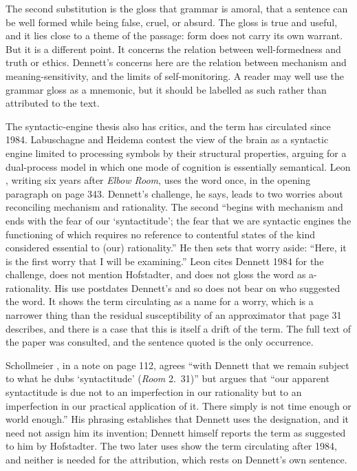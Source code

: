 \documentclass[11pt]{article}
\begin{document}
The second substitution is the gloss that grammar is amoral, that a sentence can be well formed while being false, cruel, or absurd. The gloss is true and useful, and it lies close to a theme of the passage: form does not carry its own warrant. But it is a different point. It concerns the relation between well-formedness and truth or ethics. Dennett's concerns here are the relation between mechanism and meaning-sensitivity, and the limits of self-monitoring. A reader may well use the grammar gloss as a mnemonic, but it should be labelled as such rather than attributed to the text.

The syntactic-engine thesis also has critics, and the term has circulated since 1984. Labuschagne and Heidema \cite{labuschagne2005} contest the view of the brain as a syntactic engine limited to processing symbols by their structural properties, arguing for a dual-process model in which one mode of cognition is essentially semantical. Leon \cite{leon1990}, writing six years after \emph{Elbow Room}, uses the word once, in the opening paragraph on page 343. Dennett's challenge, he says, leads to two worries about reconciling mechanism and rationality. The second ``begins with mechanism and ends with the fear of our `syntactitude'{}; the fear that we are syntactic engines the functioning of which requires no reference to contentful states of the kind considered essential to (our) rationality.'' He then sets that worry aside: ``Here, it is the first worry that I will be examining.'' Leon cites Dennett 1984 for the challenge, does not mention Hofstadter, and does not gloss the word as a-rationality. His use postdates Dennett's and so does not bear on who suggested the word. It shows the term circulating as a name for a worry, which is a narrower thing than the residual susceptibility of an approximator that page 31 describes, and there is a case that this is itself a drift of the term. The full text of the paper was consulted, and the sentence quoted is the only occurrence.

Schollmeier \cite{schollmeier2009}, in a note on page 112, agrees ``with Dennett that we remain subject to what he dubs `syntactitude' (\emph{Room} 2.~31)'' but argues that ``our apparent syntactitude is due not to an imperfection in our rationality but to an imperfection in our practical application of it. There simply is not time enough or world enough.'' His phrasing establishes that Dennett uses the designation, and it need not assign him its invention; Dennett himself reports the term as suggested to him by Hofstadter. The two later uses show the term circulating after 1984, and neither is needed for the attribution, which rests on Dennett's own sentence.
\end{document}
